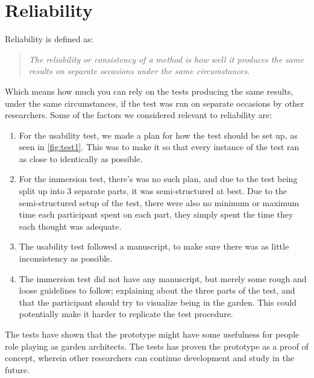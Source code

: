 \section*{Reliability}
	Reliability is defined as:\\
	\begin{quote}
		\textit{The reliability or consistency of a method is how well it produces the same results on separate occasions under the same circumstances}\cite{interactionDesign}.\\
	\end{quote}
	Which means how much you can rely on the tests producing the same results, under the same circumstances, if the test was run on separate occasions by other researchers. Some of the factors we considered relevant to reliability are:\\
	\begin{enumerate}
		\item For the usability test, we made a plan for how the test should be set up, as seen in \autoref{fig:test1}. This was to make it so that every instance of the test ran as close to identically as possible.\\
		
		\item For the immersion test, there's was no such plan, and due to the test being split up into 3 separate parts, it was semi-structured at best. Due to the semi-structured setup of the test, there were also no minimum or maximum time each participant spent on each part, they simply spent the time they each thought was adequate.\\
		
		\item The usability test followed a manuscript, to make sure there was as little inconsistency as possible.\\
		
		\item The immersion test did not have any manuscript, but merely some rough and loose guidelines to follow; explaining about the three parts of the test, and that the participant should try to visualize being in the garden. This could potentially make it harder to replicate the test procedure.\\
	\end{enumerate}
	The tests have shown that the prototype might have some usefulness for people role playing as garden architects. The tests has proven the prototype as a proof of concept, wherein other researchers can continue development and study in the future.
	
